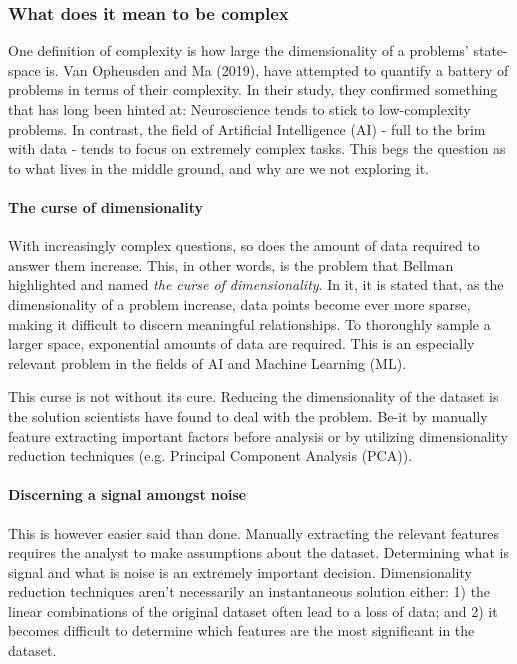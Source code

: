 \documentclass[11pt]{article}
\begin{document}
\subsubsection{What does it mean to be complex}
One definition of complexity is how large the dimensionality of a problems' state-space is. Van Opheusden and Ma (2019), have attempted to quantify a battery of problems in terms of their complexity. In their study, they confirmed something that has long been hinted at: Neuroscience tends to stick to low-complexity problems. In contrast, the field of Artificial Intelligence (AI) - full to the brim with data - tends to focus on extremely complex tasks. This begs the question as to what lives in the middle ground, and why are we not exploring it.
\paragraph{The curse of dimensionality}
With increasingly complex questions, so does the amount of data required to answer them increase. This, in other words, is the problem that Bellman \cite{bellman1957dynamic} highlighted and named \textit{the curse of dimensionality}.
In it, it is stated that, as the dimensionality of a problem increase, data points become ever more sparse, making it difficult to discern meaningful relationships. To thoroughly sample a larger space, exponential amounts of data are required. This is an especially relevant problem in the fields of AI and Machine Learning (ML).

This curse is not without its cure. Reducing the dimensionality of the dataset is the solution scientists have found to deal with the problem. Be-it by manually feature extracting important factors before analysis or by utilizing dimensionality reduction techniques (e.g. Principal Component Analysis (PCA)).
\paragraph{Discerning a signal amongst noise}
This is however easier said than done. Manually extracting the relevant features requires the analyst to make assumptions about the dataset. Determining what is signal and what is noise is an extremely important decision. Dimensionality reduction techniques aren't necessarily an instantaneous solution either: 1) the linear combinations of the original dataset often lead to a loss of data; and 2) it becomes difficult to determine which features are the most significant in the dataset.
\end{document}
